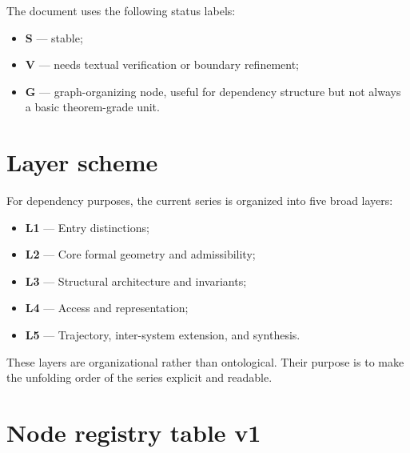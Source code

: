 \documentclass[11pt,a4paper]{article}
\begin{document}
	The document uses the following status labels:
	\begin{itemize}[leftmargin=2em]
		\item \textbf{S} --- stable;
		\item \textbf{V} --- needs textual verification or boundary refinement;
		\item \textbf{G} --- graph-organizing node, useful for dependency structure but not always a
		basic theorem-grade unit.
	\end{itemize}
	
	\section{Layer scheme}
	
	For dependency purposes, the current series is organized into five broad layers:
	
	\begin{itemize}[leftmargin=2em]
		\item \textbf{L1} --- Entry distinctions;
		\item \textbf{L2} --- Core formal geometry and admissibility;
		\item \textbf{L3} --- Structural architecture and invariants;
		\item \textbf{L4} --- Access and representation;
		\item \textbf{L5} --- Trajectory, inter-system extension, and synthesis.
	\end{itemize}
	
	These layers are organizational rather than ontological. Their purpose is to make the unfolding
	order of the series explicit and readable.
	
	\section{Node registry table v1}
	
\end{document}
